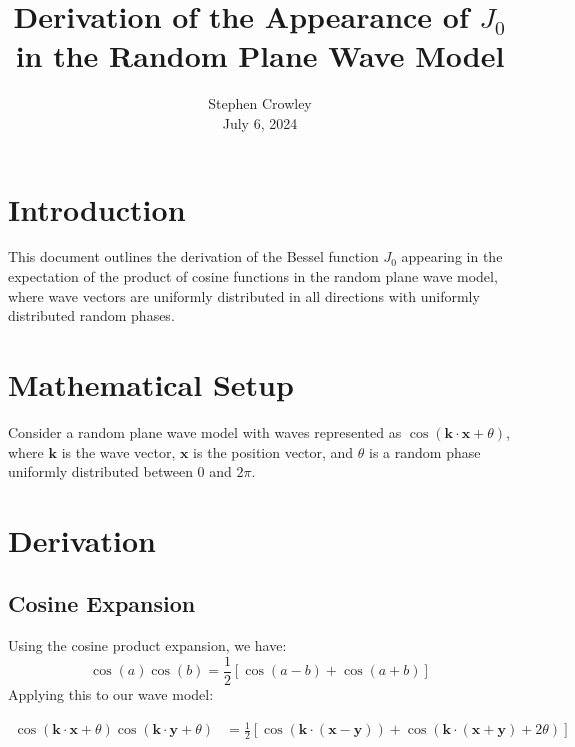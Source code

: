 \documentclass{article}
\newcommand{\tmaffiliation}[1]{\\ #1}
\begin{document}
{\cdot}\title{Derivation of the Appearance of $J_0$ in the Random Plane Wave
Model}

\author{
  Stephen Crowley
  \tmaffiliation{July 6, 2024}
}

\maketitle

\section{Introduction}

This document outlines the derivation of the Bessel function $J_0$ appearing
in the expectation of the product of cosine functions in the random plane wave
model, where wave vectors are uniformly distributed in all directions with
uniformly distributed random phases.

\section{Mathematical Setup}

Consider a random plane wave model with waves represented as $\cos (\mathbf{k}
\cdot \mathbf{x} + \theta)$, where $\mathbf{k}$ is the wave vector,
$\mathbf{x}$ is the position vector, and $\theta$ is a random phase uniformly
distributed between $0$ and $2 \pi$.

\section{Derivation}

\subsection{Cosine Expansion}

Using the cosine product expansion, we have:
\begin{equation}
  \cos (a) \cos (b) = \frac{1}{2}  [\cos (a - b) + \cos (a + b)]
\end{equation}
Applying this to our wave model:

\begin{align*}
  \cos (\mathbf{k} \cdot \mathbf{x} + \theta) \cos (\mathbf{k} \cdot
  \mathbf{y} + \theta) & = \frac{1}{2}  [\cos (\mathbf{k} \cdot (\mathbf{x} -
  \mathbf{y})) + \cos (\mathbf{k} \cdot (\mathbf{x} + \mathbf{y}) + 2 \theta)]
\end{align*}
\end{document}
